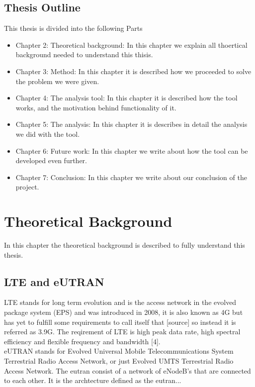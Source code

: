 \documentclass[cropmarks, frame, english]{idamasterthesis}
\begin{document}
\section{Thesis Outline}
This thesis is divided into the following Parts
\begin{itemize}
\item Chapter 2: Theoretical background: In this chapter we explain all thoertical background needed to understand this thisis.
\item Chapter 3: Method: In this chapter it is described how we proceeded to solve the problem we were given.
\item Chapter 4: The analysis tool: In this chapter it is described how the tool works, and the motivation behind functionality of it.
\item Chapter 5: The analysis: In this chapter it is describes in detail the analysis we did with the tool.
\item Chapter 6: Future work: In this chapter we write about how the tool can be developed even further.
\item Chapter 7: Conclusion: In this chapter we write about our conclusion of the project.
\end{itemize}






















\chapter{Theoretical Background} %
In this chapter the theoretical background is described to fully understand this thesis.


\section{LTE and eUTRAN}
LTE stands for long term evolution and is the access network in the evolved package system (EPS) and was introduced in 2008, it is also known as 4G but has yet to fulfill some requirements to call itself that [source] so instead it is referred as 3.9G. The reqirement of LTE is high peak data rate, high spectral efficiency and flexible frequency and bandwidth [4].
\\
eUTRAN stands for Evolved Universal Mobile Telecommunications System Terrestrial Radio Access Network, or just Evolved UMTS Terrestrial Radio Access Network. The eutran consist of a network of eNodeB's that are connected to each other. It is the archtecture defined as the eutran...
\end{document}

